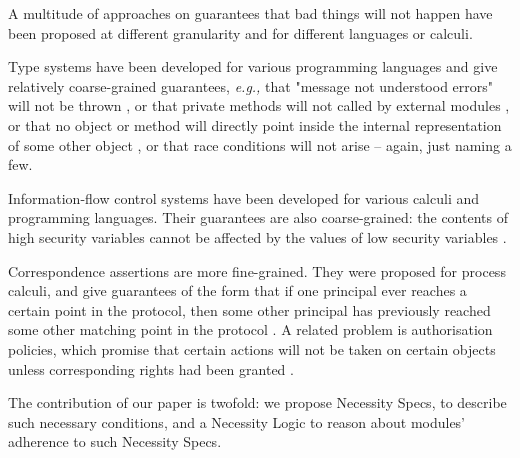  
A multitude of approaches on guarantees that
bad things will not happen have been proposed at different granularity and 
for different languages or calculi.   
 
Type systems have been developed for various programming languages 
and give relatively coarse-grained guarantees, \emph{e.g.,} 
 that "message not understood errors" 
will not be thrown \cite{EiffelCook},
or that private methods will not called by external modules \cite{JavaAccess},
or that  no object or method will directly point inside the internal representation of some other object
\cite{ownaliasDONTUSE},
or that race conditions will not arise  \cite{mindori} -- again, just naming a few.

 Information-flow control  systems have been developed for
various calculi and programming languages. Their 
 guarantees are also coarse-grained:  the contents of high security variables cannot
be affected by the values of low security variables \cite{Zdancewic:Myers:01,noninteferenceOS}. 
 
Correspondence assertions are more fine-grained. They were proposed for 
process calculi,  and give guarantees of the form that if one principal
 ever reaches a certain point in the protocol, then some other principal has 
 previously reached some other matching point in the protocol  \cite{correspondence}. 
A related problem is authorisation policies, which promise that 
certain actions will not be taken on certain objects
unless corresponding  rights had been granted
 \cite{auhtorInDistr}.
 
 
 
 The contribution of our paper is twofold: we propose Necessity Specs, to describe such necessary conditions,
 and a Necessity Logic to reason about modules' adherence to such Necessity Specs. 
 

